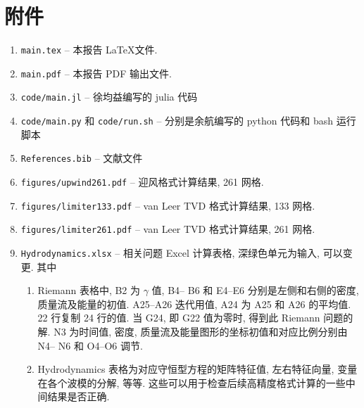 \documentclass[10.5pt
]{article}
\begin{document}
\section{附件\protect\footnotemark}

\begin{enumerate}

\item
\verb|main.tex|
-- 本报告 \LaTeX  文件.
\item
\verb|main.pdf|
-- 本报告 PDF 输出文件.
\item
\verb|code/main.jl|
--  徐均益编写的 julia 代码
\item
\verb|code/main.py| 和 
\verb|code/run.sh|
--  分别是余航编写的 python 代码和 bash 运行脚本
\item
\verb|References.bib|
--  文献文件
\item
\verb|figures/upwind261.pdf|
-- 迎风格式计算结果, 261 网格.
\item
\verb|figures/limiter133.pdf|
-- van Leer TVD 格式计算结果, 133 网格.
\item
\verb|figures/limiter261.pdf|
-- van Leer TVD 格式计算结果, 261 网格.
\item
\verb|Hydrodynamics.xlsx|
-- 相关问题 Excel 计算表格, 深绿色单元为输入, 可以变更. 其中

\begin{enumerate}
\item
  Riemann 表格中, B2 为 $\gamma$ 值, B4-- B6 和 E4--E6 分别是左侧和右侧的密度, 质量流及能量的初值. A25--A26 迭代用值, A24 为 A25 和 A26 的平均值.
  22 行复制 24 行的值. 当 G24, 即 G22 值为零时, 得到此 Riemann 问题的解. N3 为时间值, 密度, 质量流及能量图形的坐标初值和对应比例分别由 N4-- N6 和 O4--O6 调节.
\item
Hydrodynamics 表格为对应守恒型方程的矩阵特征值, 左右特征向量, 变量在各个波模的分解, 等等. 这些可以用于检查后续高精度格式计算的一些中间结果是否正确.
\end{enumerate}
\end{enumerate}



\end{document}
